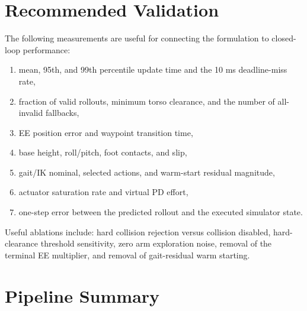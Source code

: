 \documentclass[11pt,a4paper]{article}
\begin{document}
\section{Recommended Validation}

The following measurements are useful for connecting the formulation to
closed-loop performance:
\begin{enumerate}
  \item mean, 95th, and 99th percentile update time and the 10 ms deadline-miss
        rate,
  \item fraction of valid rollouts, minimum torso clearance, and the number of
        all-invalid fallbacks,
  \item EE position error and waypoint transition time,
  \item base height, roll/pitch, foot contacts, and slip,
  \item gait/IK nominal, selected actions, and warm-start residual magnitude,
  \item actuator saturation rate and virtual PD effort,
  \item one-step error between the predicted rollout and the executed
        simulator state.
\end{enumerate}

Useful ablations include: hard collision rejection versus collision disabled,
hard-clearance threshold sensitivity, zero arm exploration noise, removal of
the terminal EE multiplier, and removal of gait-residual warm starting.

\section{Pipeline Summary}
\end{document}
